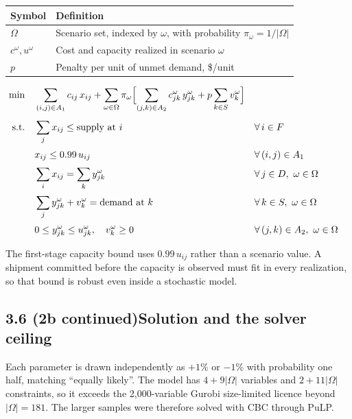 \documentclass[11pt]{article}
\DeclareMathOperator*{\minimize}{min}
\begin{document}
\begin{center}
\begin{tabular}{@{}ll@{}}
\toprule
Symbol & Definition \\
\midrule
$\Omega$ & Scenario set, indexed by $\omega$, with probability
           $\pi_{\omega} = 1/|\Omega|$ \\
$c^{\omega}, u^{\omega}$ & Cost and capacity realized in scenario $\omega$ \\
$p$ & Penalty per unit of unmet demand, \$/unit \\
\bottomrule
\end{tabular}
\end{center}

\begin{align}
  \minimize \quad
    & \sum_{(i,j) \in A_1} c_{ij}\, x_{ij}
      + \sum_{\omega \in \Omega} \pi_{\omega}
        \Bigl[ \sum_{(j,k) \in A_2} c^{\omega}_{jk}\, y^{\omega}_{jk}
             + p \sum_{k \in S} v^{\omega}_{k} \Bigr] \\[4pt]
  \text{s.t.} \quad
    & \sum_{j} x_{ij} \le \text{supply at } i && \forall\, i \in F \\[2pt]
    & x_{ij} \le 0.99\, u_{ij} && \forall\, (i,j) \in A_1 \\[2pt]
    & \sum_{i} x_{ij} = \sum_{k} y^{\omega}_{jk}
      && \forall\, j \in D,\ \omega \in \Omega \\[2pt]
    & \sum_{j} y^{\omega}_{jk} + v^{\omega}_{k} = \text{demand at } k
      && \forall\, k \in S,\ \omega \in \Omega \\[2pt]
    & 0 \le y^{\omega}_{jk} \le u^{\omega}_{jk}, \quad v^{\omega}_{k} \ge 0
      && \forall\, (j,k) \in A_2,\ \omega \in \Omega
\end{align}

The first-stage capacity bound uses $0.99\, u_{ij}$ rather than a
scenario value. A shipment committed before the capacity is observed
must fit in every realization, so that bound is robust even inside a
stochastic model.

\subsection*{3.6 (2b continued)\quad Solution and the solver ceiling}

Each parameter is drawn independently as $+1\%$ or $-1\%$ with
probability one half, matching ``equally likely''. The model has
$4 + 9|\Omega|$ variables and $2 + 11|\Omega|$ constraints, so it exceeds
the 2,000-variable Gurobi size-limited licence beyond $|\Omega| = 181$. The
larger samples were therefore solved with CBC through PuLP.
\end{document}
